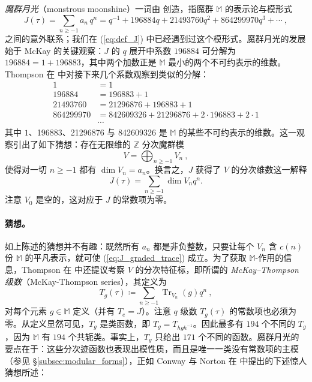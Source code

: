 \documentclass[11pt,a4paper,fontset=windows]{ctexart}
\numberwithin{equation}{section}
\newcommand{\myparagraph}[1]{\paragraph{#1}\mbox\\}
\newcommand{\ZZ}{\mathbb{Z}}
\newcommand{\MM}{\mathbb{M}}
\newcommand{\tr}{\operatorname{Tr}}
\newcommand{\eq}[1]{(\ref{#1})}
\begin{document}
\emph{魔群月光}（monstrous moonshine）一词由 \cite{conway_norton} 创造，指魔群 $\MM$ 的表示论与模形式
\begin{equation}\label{Jcoeff}
J(\tau)=\sum_{n\geq-1}a_n \, q^n=q^{-1}+196884q+21493760q^2+864299970q^3+\cdots~,
\end{equation}
之间的意外联系；我们在 \eq{eq:def_J} 中已经遇到过这个模形式。魔群月光的发展始于 McKay 的关键观察：$J$ 的 $q$ 展开中系数 $196884$ 可分解为 $196884=1+196883$，其中两个加数正是 $\MM$ 最小的两个不可约表示的维数。Thompson 在 \cite{Tho_NmrlgyMonsEllModFn} 中对接下来几个系数观察到类似的分解：
\begin{equation}
\label{eq:J_decomp}
\begin{split}
1&=1 \\
196884&=196883+1 \\
21493760&=21296876+196883+1 \\
864299970&=842609326+21296876+2\cdot196883+2\cdot1 \\
&\cdots 
\end{split}
\end{equation}
其中 $1$、196883、21296876 与 842609326 是 $\MM$ 的某些不可约表示的维数。这一观察引出了如下猜想：存在无限维的 $\ZZ$ 分次魔群模
\begin{equation}
V=\bigoplus_{n\geq-1}V_n~,
\end{equation}
使得对一切 $n\geq-1$ 都有 $\dim V_n=a_n$。换言之，$J$ 获得了 $V$ 的分次维数这一解释
\begin{equation}
\label{eq:J_graded_trace}
J(\tau)=\sum_{n\geq-1}\dim V_n q^n.
\end{equation}
注意 $V_0$ 是空的，这对应于 $J$ 的常数项为零。



\myparagraph{猜想。}
如上陈述的猜想并不有趣：既然所有 $a_n$ 都是非负整数，只要让每个 $V_n$ 含 $c(n)$ 份 $\MM$ 的平凡表示，就可使 \eq{eq:J_graded_trace} 成立。为了获取 $\MM$-作用的信息，Thompson 在 \cite{Tho_FinGpsModFns} 中还提议考察 $V$ 的分次特征标，即所谓的 \emph{McKay–Thompson 级数}（McKay-Thompson series），其定义为
\begin{equation}
T_g(\tau)\coloneqq\sum_{n\geq-1}\tr_{V_n}(g)q^n~,
\end{equation}
对每个元素 $g\in\mathbb M$ 定义（并有 $T_e=J$）。注意 $q$ 级数 $T_g(\tau)$ 的常数项也必须为零。从定义显然可见，$T_g$ 是类函数，即 $T_g=T_{hgh^{-1}}$。因此最多有 $194$ 个不同的 $T_g$，因为 $\MM$ 有 $194$ 个共轭类。事实上，$T_g$ 只给出 $171$ 个不同的函数。魔群月光的要点在于：这些分次迹函数也表现出模性质，而且是唯一一类没有常数项的主模（参见 \S\ref{subsec:modular_forms}），正如 Conway 与 Norton 在 \cite{conway_norton} 中提出的下述惊人猜想所述：
\end{document}
